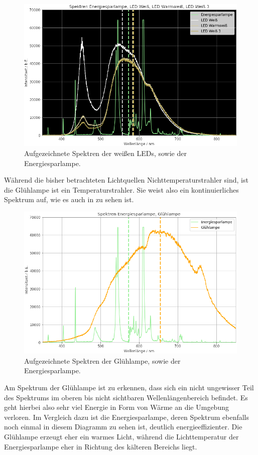 \begin{figure}[H]
  \centering
  \includegraphics[width=.9\textwidth]{files/plots/led_und_energiespar.png}
  \caption{Aufgezeichnete Spektren der weißen LEDs, sowie der Energiesparlampe.}
  \label{fig:led_und_energiespar}
\end{figure}

Während die bisher betrachteten Lichtquellen Nichttemperaturstrahler sind, ist die Glühlampe ist ein Temperaturstrahler. Sie weist also ein kontinuierliches Spektrum auf, wie es auch in  zu sehen ist.

\begin{figure}[H]
  \centering
  \includegraphics[width=.9\textwidth]{files/plots/energiespar_und_glueh.png}
  \caption{Aufgezeichnete Spektren der Glühlampe, sowie der Energiesparlampe.}
  \label{fig:energiespar_und_glueh}
\end{figure}

Am Spektrum der Glühlampe ist zu erkennen, dass sich ein nicht ungewisser Teil des Spektrums im oberen bis nicht sichtbaren Wellenlängenbereich befindet. Es geht hierbei also sehr viel Energie in Form von Wärme an die Umgebung verloren. Im Vergleich dazu ist die Energiesparlampe, deren Spektrum ebenfalls noch einmal in diesem Diagramm zu sehen ist, deutlich energieeffizienter. Die Glühlampe erzeugt eher ein warmes Licht, während die Lichttemperatur der Energiesparlampe eher in Richtung des kälteren Bereichs liegt.